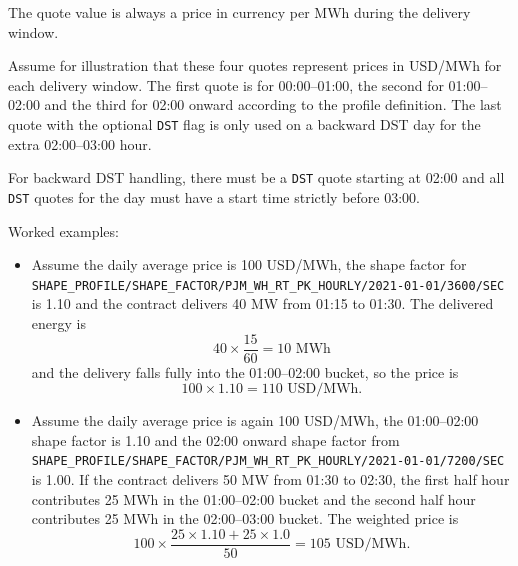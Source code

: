 The quote value is always a price in currency per MWh during the delivery window.

Assume for illustration that these four quotes represent prices in USD/MWh for each delivery window. The first quote
is for 00:00--01:00, the second for 01:00--02:00 and the third for 02:00 onward according to the profile definition.
The last quote with the optional \lstinline!DST! flag is only used on a backward DST day for the extra 02:00--03:00
hour.

For backward DST handling, there must be a \lstinline!DST! quote starting at 02:00 and all \lstinline!DST! quotes for
the day must have a start time strictly before 03:00.

Worked examples:
\begin{itemize}
\item Assume the daily average price is 100 USD/MWh, the shape factor for
  \lstinline!SHAPE_PROFILE/SHAPE_FACTOR/PJM_WH_RT_PK_HOURLY/2021-01-01/3600/SEC! is 1.10 and the contract delivers
  40 MW from 01:15 to 01:30. The delivered energy is
$$
40 \times \frac{15}{60} = 10 \text{ MWh}
$$
and the delivery falls fully into the 01:00--02:00 bucket, so the price is
$$
100 \times 1.10 = 110 \text{ USD/MWh}.
$$

\item Assume the daily average price is again 100 USD/MWh, the 01:00--02:00 shape factor is 1.10 and the 02:00 onward
  shape factor from \lstinline!SHAPE_PROFILE/SHAPE_FACTOR/PJM_WH_RT_PK_HOURLY/2021-01-01/7200/SEC! is 1.00. If the
  contract delivers 50 MW from 01:30 to 02:30, the first half hour contributes 25 MWh in the 01:00--02:00 bucket and
  the second half hour contributes 25 MWh in the 02:00--03:00 bucket. The weighted price is
$$
100 \times \frac{25 \times 1.10 + 25 \times 1.0}{50} = 105 \text{ USD/MWh}.
$$
\end{itemize}